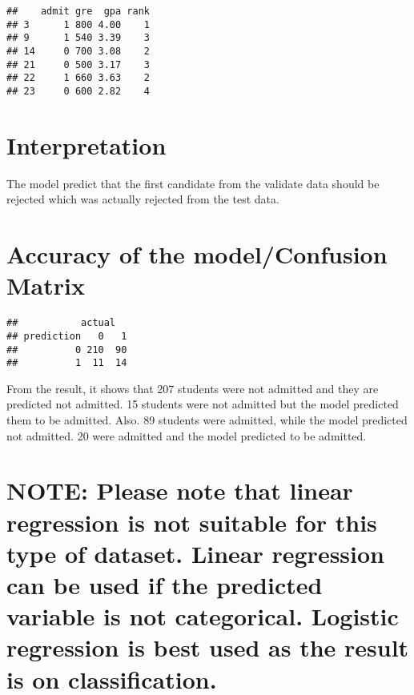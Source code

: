\documentclass[
]{article}
\newenvironment{Shaded}{\begin{snugshade}}{\end{snugshade}}
\newcommand{\AttributeTok}[1]{\textcolor[rgb]{0.77,0.63,0.00}{#1}}
\newcommand{\DecValTok}[1]{\textcolor[rgb]{0.00,0.00,0.81}{#1}}
\newcommand{\FloatTok}[1]{\textcolor[rgb]{0.00,0.00,0.81}{#1}}
\newcommand{\FunctionTok}[1]{\textcolor[rgb]{0.00,0.00,0.00}{#1}}
\newcommand{\NormalTok}[1]{#1}
\newcommand{\OtherTok}[1]{\textcolor[rgb]{0.56,0.35,0.01}{#1}}
\newcommand{\SpecialCharTok}[1]{\textcolor[rgb]{0.00,0.00,0.00}{#1}}
\begin{document}
\begin{verbatim}
##    admit gre  gpa rank
## 3      1 800 4.00    1
## 9      1 540 3.39    3
## 14     0 700 3.08    2
## 21     0 500 3.17    3
## 22     1 660 3.63    2
## 23     0 600 2.82    4
\end{verbatim}

\hypertarget{interpretation}{%
\section{Interpretation}\label{interpretation}}

The model predict that the first candidate from the validate data should
be rejected which was actually rejected from the test data.

\hypertarget{accuracy-of-the-modelconfusion-matrix}{%
\section{Accuracy of the model/Confusion
Matrix}\label{accuracy-of-the-modelconfusion-matrix}}

\begin{Shaded}
\end{Shaded}

\begin{verbatim}
##           actual
## prediction   0   1
##          0 210  90
##          1  11  14
\end{verbatim}

From the result, it shows that 207 students were not admitted and they
are predicted not admitted. 15 students were not admitted but the model
predicted them to be admitted. Also. 89 students were admitted, while
the model predicted not admitted. 20 were admitted and the model
predicted to be admitted.

\hypertarget{note-please-note-that-linear-regression-is-not-suitable-for-this-type-of-dataset.-linear-regression-can-be-used-if-the-predicted-variable-is-not-categorical.-logistic-regression-is-best-used-as-the-result-is-on-classification.}{%
\section{NOTE: Please note that linear regression is not suitable for
this type of dataset. Linear regression can be used if the predicted
variable is not categorical. Logistic regression is best used as the
result is on
classification.}\label{note-please-note-that-linear-regression-is-not-suitable-for-this-type-of-dataset.-linear-regression-can-be-used-if-the-predicted-variable-is-not-categorical.-logistic-regression-is-best-used-as-the-result-is-on-classification.}}
\end{document}
